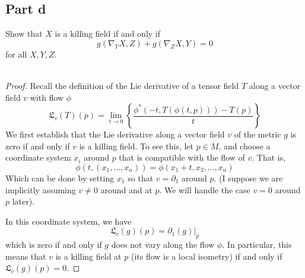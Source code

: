 \documentclass[fontsize=11pt]{scrartcl} %
\numberwithin{equation}{section} %
\numberwithin{figure}{section} %
\numberwithin{table}{section} %
\begin{document}
\subsection*{Part d}
Show that $X$ is a killing field if and only if
\[
    g(\nabla_YX,Z) + g(\nabla_ZX,Y)=0
\]
for all $X,Y,Z$. 
\\
\\
\begin{proof}
    Recall the definition of the Lie derivative of a tensor field $T$ along a
    vector field $v$ with flow $\phi$
    \[
        \mathfrak{L}_v(T)(p) = \lim_{t\to 0}\left\{
        \frac{\phi^*(-t,T(\phi(t,p)))-T(p)}{t} \right\}
    \]
    We first establish that the Lie derivative along a vector field $v$ of the
    metric $g$ is zero if and only if $v$ is a killing field.
    To see this, let $p\in M$, and choose a coordinate system $x_i$ around $p$
    that is compatible with the flow of $v$. That is, 
    \[
        \phi(t,(x_1,\dots,x_n)) = \phi(x_1+t,x_2,\dots,x_n)
    \]
    Which can be done by setting $x_1$ so that $v = \partial_1$ around $p$. (I
        suppose we are implicitly assuming $v\neq 0$ around and at $p$. We will
    handle the case $v=0$ around $p$ later).
    
    In this coordinate system, we have
    \[
        \mathfrak{L}_v(g)(p) = \partial_1(g)|_p
    \]
    which is zero if and only if $g$ does not vary along the flow $\phi$. In
    particular, this means that $v$ is a killing field at $p$ (its flow is a
    local isometry) if and only if $\mathfrak{L}_v(g)(p) = 0$.


\end{proof}
\end{document}
